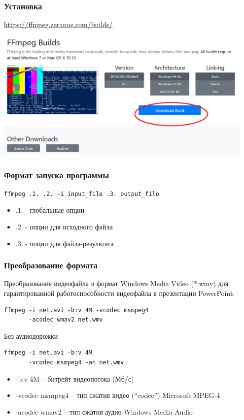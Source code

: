 \documentclass[11pt, compress]{beamer}
\renewcommand{\emph}[1]{\textcolor{dark-blue}{#1}}
\begin{document}
\begin{frame}[t]
\frametitle{Установка}
\url{https://ffmpeg.zeranoe.com/builds/}
\centering
\includegraphics[width=0.95\textwidth]{ffmpeg_install_2.png}
\end{frame}

\begin{frame}[c, fragile]
\frametitle{Формат запуска программы}
\begin{lstlisting}
ffmpeg .1. .2. -i input_file .3. output_file
\end{lstlisting}
\begin{itemize}
  \item .1. - глобальные опции
  \item .2. - опции для исходного файла
  \item .3. - опции для файла-результата  
\end{itemize}
\end{frame}


\begin{frame}[c, fragile]
\frametitle{Преобразование формата}
Преобразование видеофайла в формат Windows Media Video (*.wmv) для гарантированной работоспособности видеофайла в презентации PowerPoint:
\begin{lstlisting}
ffmpeg -i net.avi -b:v 4M -vcodec msmpeg4 
       -acodec wmav2 net.wmv
\end{lstlisting}
Без аудиодорожки
\begin{lstlisting}
ffmpeg -i net.avi -b:v 4M 
       -vcodec msmpeg4 -an net.wmv
\end{lstlisting}
\begin{itemize}
\item \emph{-b:v 4M} -- битрейт видеопотока (Мб/с)
\item \emph{-vcodec msmpeg4} -- тип сжатия видео (``codec'') Microsoft MPEG-4
\item \emph{-acodec wmav2} -- тип сжатия аудио Windows Media Audio
\end{itemize}
\end{frame}
\end{document}
